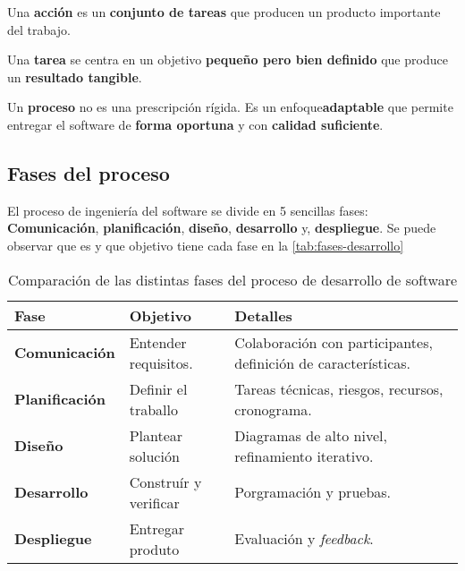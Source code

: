 \begin{definicion}
    Una \textbf{acción} es un \textbf{conjunto de tareas} que producen un producto importante del trabajo.
\end{definicion}
\begin{definicion}
    Una \textbf{tarea} se centra en un objetivo \textbf{pequeño pero bien definido} que produce un \textbf{resultado tangible}.
\end{definicion}
\begin{definicion}
    Un \textbf{proceso} no es una prescripción rígida.
    Es un enfoque\textbf{adaptable} que permite entregar el software de \textbf{forma oportuna} y con \textbf{calidad suficiente}.
\end{definicion}

\subsection{Fases del proceso}\label{subsec:fases-del-proceso}
El proceso de ingeniería del software se divide en 5 sencillas fases: \textbf{Comunicación}, \textbf{planificación}, \textbf{diseño}, \textbf{desarrollo} y, \textbf{despliegue}.
Se puede observar que es y que objetivo tiene cada fase en la \autoref{tab:fases-desarrollo}

\begin{table}[hbtp]
    \centering

    \begin{tabularx}{\textwidth}{|l l X|}\toprule
    Fase & Objetivo& Detalles \\\midrule

    \textbf{Comunicación} & Entender requisitos.& Colaboración con participantes, definición de características. \\
    \textbf{Planificación} & Definir el traballo& Tareas técnicas, riesgos, recursos, cronograma.\\
    \textbf{Diseño}& Plantear solución & Diagramas de alto nivel, refinamiento iterativo.\\
    \textbf{Desarrollo}& Construír y verificar& Porgramación y pruebas.\\
    \textbf{Despliegue}& Entregar produto & Evaluación y \textit{feedback}.\\ \bottomrule

    \end{tabularx}
    \caption{Comparación de las distintas fases del proceso de desarrollo de software}
    \label{tab:fases-desarrollo}

\end{table}


